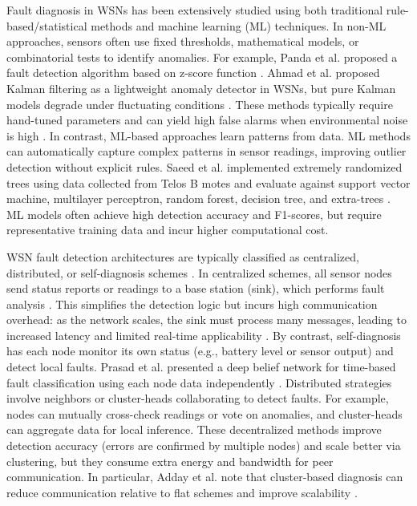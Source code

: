 Fault diagnosis in WSNs has been extensively studied using both traditional rule-based/statistical methods and machine learning (ML) techniques. In non-ML approaches, sensors often use fixed thresholds, mathematical models, or combinatorial tests to identify anomalies. For example, Panda et al. proposed a fault detection algorithm based on z-score function \cite{Panda2014}. Ahmad et al. proposed Kalman filtering as a lightweight anomaly detector in WSNs, but pure Kalman models degrade under fluctuating conditions \cite{Ahmad2024}. These methods typically require hand-tuned parameters and can yield high false alarms when environmental noise is high \cite{Muhammed2017, Zhang2018}. In contrast, ML-based approaches learn patterns from data. ML methods can automatically capture complex patterns in sensor readings, improving outlier detection without explicit rules. Saeed et al. implemented extremely randomized trees using data collected from Telos B motes and evaluate against support vector machine, multilayer perceptron, random forest, decision tree, and extra-trees \cite{Saeed2021}. ML models often achieve high detection accuracy and F1-scores, but require representative training data and incur higher computational cost.

WSN fault detection architectures are typically classified as centralized, distributed, or self-diagnosis schemes \cite{Takele2024, Prasad2023}. In centralized schemes, all sensor nodes send status reports or readings to a base station (sink), which performs fault analysis \cite{Panda2014}. This simplifies the detection logic but incurs high communication overhead: as the network scales, the sink must process many messages, leading to increased latency and limited real-time applicability \cite{Muhammed2017, Zhang2018}. By contrast, self-diagnosis has each node monitor its own status (e.g., battery level or sensor output) and detect local faults. Prasad et al. presented a deep belief network for time-based fault classification using each node data independently \cite{Prasad2023}. Distributed strategies involve neighbors or cluster-heads collaborating to detect faults. For example, nodes can mutually cross-check readings or vote on anomalies, and cluster-heads can aggregate data for local inference. These decentralized methods improve detection accuracy (errors are confirmed by multiple nodes) and scale better via clustering, but they consume extra energy and bandwidth for peer communication. In particular, Adday et al. note that cluster-based diagnosis can reduce communication relative to flat schemes and improve scalability \cite{Adday2022}.

